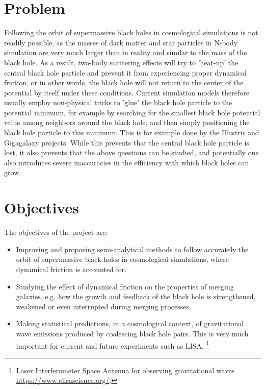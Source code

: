 \documentclass[a4,useAMS,usenatbib,usegraphicx,12pt]{article}
\begin{document}
\section{Problem}


Following the orbit of supermassive black holes in cosmological simulations is 
not readily possible, as the masses of dark matter and star particles in N-body 
simulation are very much larger than in reality and similar to the mass of the 
black hole. As a result, two-body scattering effects will try to 'heat-up' the 
central black hole particle and prevent it from experiencing proper dynamical 
friction, or in other words, the black hole will not return to the center of the 
potential by itself under these conditions. Current simulation models therefore 
usually employ non-physical tricks to 'glue' the black hole particle to the 
potential minimum, for example by searching for the smallest black hole potential 
value among neighbors around the black hole, and then simply positioning the black 
hole particle to this minimum. This is for example done by the Illustris and 
Gigagalaxy projects. While this prevents that the central black hole particle is 
lost, it also prevents that the above questions can be studied, and potentially 
one also introduces severe inaccuracies in the efficiency with which black holes 
can grow.


\section{Objectives}

The objectives of the project are:

\begin{itemize}

\item[\checkmark] Improving and proposing semi-analytical methods to follow 
accurately the orbit of supermassive black holes in cosmological simulations,
where dynamical friction is accounted for.

\item[\checkmark] Studying the effect of dynamical friction on the properties
of merging galaxies, e.g. how the growth and feedback of the black hole is 
strengthened, weakened or even interrupted during merging processes.

\item[\checkmark] Making statistical predictions, in a cosmological context, 
of gravitational wave emissions produced by coalescing black hole pairs.
This is very much important for current and future experiments such as LISA.
\footnote{Laser Interferometer Space Antenna for observing gravitational waves
\url{https://www.elisascience.org/}.}


\end{itemize}
\end{document}
